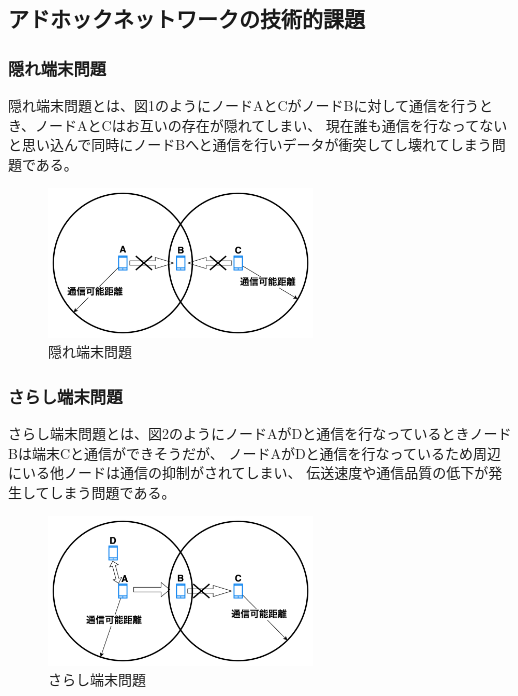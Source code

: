 \documentclass[a4paper, 10pt]{ltjsarticle}
\begin{document}
\subsection{アドホックネットワークの技術的課題}
\subsubsection{隠れ端末問題}
隠れ端末問題とは、図1のようにノードAとCがノードBに対して通信を行うとき、ノードAとCはお互いの存在が隠れてしまい、
現在誰も通信を行なってないと思い込んで同時にノードBへと通信を行いデータが衝突してし壊れてしまう問題である。%
\begin{figure}[H]
  \centering
  \includegraphics[width=70mm]{hidden_terminal_problem.png}
  \caption{隠れ端末問題}
\end{figure}

\subsubsection{さらし端末問題}
さらし端末問題とは、図2のようにノードAがDと通信を行なっているときノードBは端末Cと通信ができそうだが、
ノードAがDと通信を行なっているため周辺にいる他ノードは通信の抑制がされてしまい、
伝送速度や通信品質の低下が発生してしまう問題である。%
\begin{figure}[H]
  \centering
  \includegraphics[width=70mm]{exposed_terminal_problem.png}
  \caption{さらし端末問題}
\end{figure}
\end{document}
